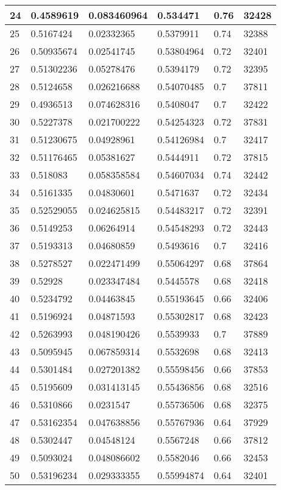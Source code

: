 \begin{longtable}{|l|l|l|l|l|l|}
24 & 0.4589619 & 0.083460964 & 0.534471 & 0.76 & 32428 \\ \hline 
25 & 0.5167424 & 0.02332365 & 0.5379911 & 0.74 & 32388 \\ \hline 
26 & 0.50935674 & 0.02541745 & 0.53804964 & 0.72 & 32401 \\ \hline 
27 & 0.51302236 & 0.05278476 & 0.5394179 & 0.72 & 32395 \\ \hline 
28 & 0.5124658 & 0.026216688 & 0.54070485 & 0.7 & 37811 \\ \hline 
29 & 0.4936513 & 0.074628316 & 0.5408047 & 0.7 & 32422 \\ \hline 
30 & 0.5227378 & 0.021700222 & 0.54254323 & 0.72 & 37831 \\ \hline 
31 & 0.51230675 & 0.04928961 & 0.54126984 & 0.7 & 32417 \\ \hline 
32 & 0.51176465 & 0.05381627 & 0.5444911 & 0.72 & 37815 \\ \hline 
33 & 0.518083 & 0.058358584 & 0.54607034 & 0.74 & 32442 \\ \hline 
34 & 0.5161335 & 0.04830601 & 0.5471637 & 0.72 & 32434 \\ \hline 
35 & 0.52529055 & 0.024625815 & 0.54483217 & 0.72 & 32391 \\ \hline 
36 & 0.5149253 & 0.06264914 & 0.54548293 & 0.72 & 32443 \\ \hline 
37 & 0.5193313 & 0.04680859 & 0.5493616 & 0.7 & 32416 \\ \hline 
38 & 0.5278527 & 0.022471499 & 0.55064297 & 0.68 & 37864 \\ \hline 
39 & 0.52928 & 0.023347484 & 0.5445578 & 0.68 & 32418 \\ \hline 
40 & 0.5234792 & 0.04463845 & 0.55193645 & 0.66 & 32406 \\ \hline 
41 & 0.5196924 & 0.04871593 & 0.55302817 & 0.68 & 32423 \\ \hline 
42 & 0.5263993 & 0.048190426 & 0.5539933 & 0.7 & 37889 \\ \hline 
43 & 0.5095945 & 0.067859314 & 0.5532698 & 0.68 & 32413 \\ \hline 
44 & 0.5301484 & 0.027201382 & 0.55598456 & 0.66 & 37853 \\ \hline 
45 & 0.5195609 & 0.031413145 & 0.55436856 & 0.68 & 32516 \\ \hline 
46 & 0.5310866 & 0.0231547 & 0.55736506 & 0.68 & 32375 \\ \hline 
47 & 0.53162354 & 0.047638856 & 0.55767936 & 0.64 & 37929 \\ \hline 
48 & 0.5302447 & 0.04548124 & 0.5567248 & 0.66 & 37812 \\ \hline 
49 & 0.5093024 & 0.048086602 & 0.5582046 & 0.66 & 32453 \\ \hline 
50 & 0.53196234 & 0.029333355 & 0.55994874 & 0.64 & 32401 \\ \hline 
\end{longtable}